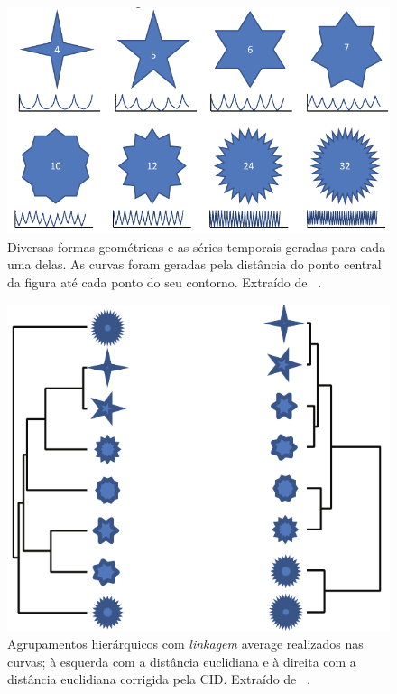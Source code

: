 \begin{figure}[h!]
	\includegraphics[width=\linewidth]{figuras/invariancias/cid_1.png}
	\caption{Diversas formas geométricas e as séries temporais geradas para cada uma delas. As curvas foram geradas pela distância do ponto central da figura até cada ponto do seu contorno. Extraído de ~\parencite{CID}.}
	\label{fig:cid_1}
\end{figure}
\begin{figure}[h!]
	\includegraphics[width=\linewidth]{figuras/invariancias/cid_2.png}
	\caption{Agrupamentos hierárquicos com \emph{linkagem} average realizados nas curvas; à esquerda com a distância euclidiana e à direita com a distância euclidiana corrigida pela CID. Extraído de ~\parencite{CID}.}
	\label{fig:cid_2}
\end{figure}

